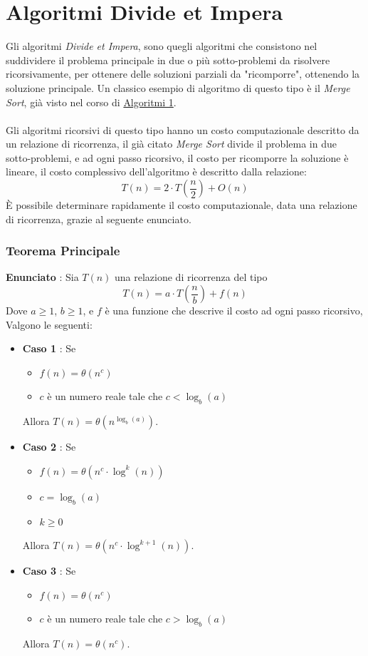 \documentclass[12pt, letterpaper]{article}
\newcommand{\acc}{\\\hphantom{}\\}
\begin{document}
\section{Algoritmi Divide et Impera}
Gli algoritmi \textit{Divide et Impera}, sono quegli algoritmi che consistono nel suddividere il problema principale
in due o più sotto-problemi da risolvere ricorsivamente, per ottenere delle soluzioni parziali da "ricomporre", ottenendo
la soluzione principale. Un classico esempio di algoritmo di questo tipo è il \textit{Merge Sort}, già visto nel corso
di
\color{blue}\href{https://github.com/CasuFrost/University_notes/blob/main/Primo%20Anno/Secondo%20Semestre/Introduzione%20agli%20algoritmi/Introduzione%20agli%20Algoritmi.pdf}{Algoritmi 1}.
\color{black}\acc
Gli algoritmi ricorsivi di questo tipo hanno un costo computazionale descritto da un relazione di ricorrenza, il già citato \textit{Merge Sort}
divide il problema in due sotto-problemi, e ad ogni passo ricorsivo, il costo per ricomporre la soluzione è lineare, il costo complessivo
dell'algoritmo è descritto dalla relazione:
$$ T(n)=2\cdot T(\dfrac{n}{2})+O(n) $$
È possibile determinare rapidamente il costo computazionale, data una relazione di ricorrenza, grazie al seguente enunciato.
\subsubsection{Teorema Principale}\label{tp}
\textbf{Enunciato } : Sia $T(n)$ una relazione di ricorrenza del tipo
$$ T(n)=a\cdot T(\dfrac{n}{b})+f(n)$$
Dove
$a\ge 1$,
$b\ge 1$,
e $f$ è una funzione che descrive il costo ad ogni passo ricorsivo,
Valgono le seguenti:\begin{itemize}
    \item \textbf{Caso 1} : Se \begin{itemize}
              \item $f(n)=\theta(n^c)$
              \item $c$ è un numero reale tale che $c<\log_b(a)$
          \end{itemize}
          Allora $T(n)=\theta(n^{\log_b(a)})$.
    \item \textbf{Caso 2} : Se \begin{itemize}
              \item $f(n)=\theta(n^c\cdot \log^k(n))$
              \item $c=\log_b(a)$
              \item $k\ge 0$
          \end{itemize}
          Allora $T(n)=\theta(n^c\cdot \log^{k+1}(n))$.
    \item \textbf{Caso 3} : Se \begin{itemize}
              \item $f(n)=\theta(n^c)$
              \item $c$ è un numero reale tale che $c>\log_b(a)$
          \end{itemize}
          Allora $T(n)=\theta(n^c)$.
\end{itemize}
\end{document}
